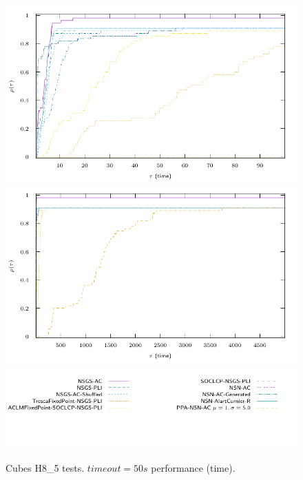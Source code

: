 \begin{figure}
  \centering
  \includegraphics[width=\widthfigure\textwidth]{../figure/profile-LMGC_Cubes_H8_5-time_0_100.pdf}
  \includegraphics[width=\widthfigure\textwidth]{../figure/profile-LMGC_Cubes_H8_5-time_0_5000.pdf}
  \includegraphics[width=\widthfigure\textwidth]{../figure/profile-LMGC_Cubes_H8_5_legend-time.pdf}
  \caption{Cubes H8\_5 tests. $timeout=50s $ performance (time). }
  \label{fig:profile-LMGC_Cubes_H8_5-time}
\end{figure}

